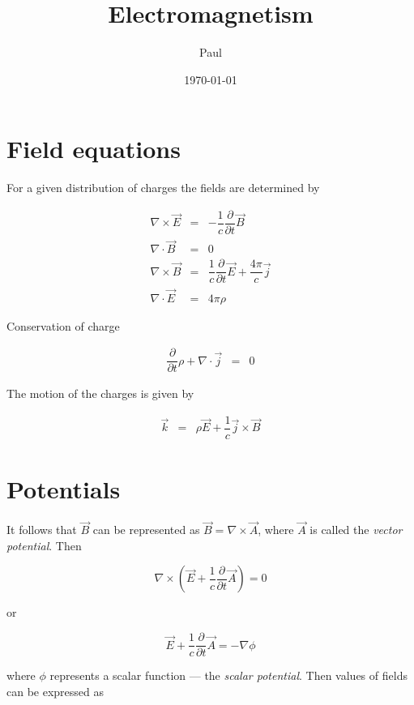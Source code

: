 \documentclass{article}
\title{Electromagnetism}
\author{Paul}
\date{\today}
\begin{document}
\maketitle

\section{Field equations}

For a given distribution of charges the fields are determined by

\begin{eqnarray*}
\nabla \times \vec{E} & = & - \dfrac{1}{c} \dfrac{\partial}{\partial t} \vec{B} \\
\nabla \cdot \vec{B} & = & 0 \\
\nabla \times \vec{B} & = & \dfrac{1}{c} \dfrac{\partial}{\partial t} \vec{E} + \dfrac{4 \pi}{c} \vec{j} \\
\nabla \cdot \vec{E} & = & 4 \pi \rho
\end{eqnarray*}

Conservation of charge

\begin{eqnarray*}
\dfrac{\partial}{\partial t} \rho + \nabla \cdot \vec{j} & = & 0
\end{eqnarray*}

The motion of the charges is given by

\begin{eqnarray*}
\vec{k} & = & \rho \vec{E} + \dfrac{1}{c} \vec{j} \times \vec{B}
\end{eqnarray*}

\section{Potentials}

It follows that $\vec{B}$ can be represented as $\vec{B} = \nabla \times \vec{A}$, where $\vec{A}$ is called the \textit{vector potential}. Then

\begin{equation*}
\nabla \times \left( \vec{E} + \dfrac{1}{c} \dfrac{\partial}{\partial t} \vec{A} \right) = 0
\end{equation*}

or

\begin{equation*}
\vec{E} + \dfrac{1}{c} \dfrac{\partial}{\partial t} \vec{A} = - \nabla \phi
\end{equation*}

where $\phi$ represents a scalar function --- the \textit{scalar potential}. Then values of fields can be expressed as
\end{document}
